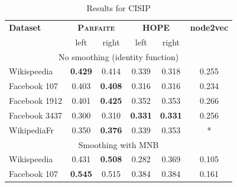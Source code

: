 \begin{table}[t]
\caption{Results for CISIP}
\begin{center}
\begin{tabular}{l|c|c|c|c|c}
\hline
\textbf{Dataset} & \multicolumn{2}{|c|}{\textbf{\textsc{Parfaite}}} & \multicolumn{2}{|c|}{\textbf{HOPE}} & \textbf{node2vec}\\
& left & right & left & right\\
\hline
\multicolumn{6}{c}{No smoothing (identity function)}\\
\hline
Wikispeedia  &  \textbf{0.429} & 0.414 & 0.339 & 0.318 & 0.255 \\
Facebook 107 & 0.403 & \textbf{0.408} & 0.316 & 0.316 & 0.234 \\
Facebook 1912 & 0.401 & \textbf{0.425} & 0.352 & 0.353 & 0.266\\
Facebook 3437 & 0.300 & 0.310 & \textbf{0.331} & \textbf{0.331} & 0.256\\
WikipediaFr  &  0.350 & \textbf{0.376} & 0.339 & 0.353 & *\\
\hline
\multicolumn{6}{c}{Smoothing with MNB}\\
\hline
Wikispeedia  &  0.431 & \textbf{0.508} & 0.282 & 0.369 & 0.105 \\
Facebook 107 & \textbf{0.545} & 0.515 & 0.384 & 0.384 & 0.161\\

\end{tabular}
\end{center}
\end{table}
